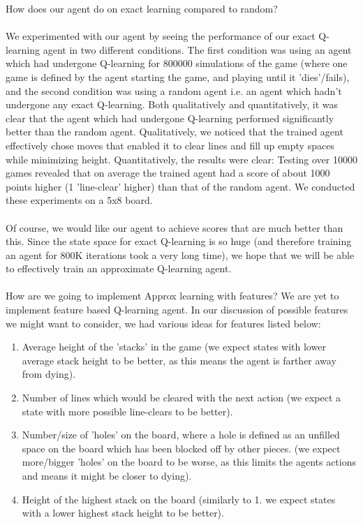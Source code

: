 \documentclass{article}
\begin{document}
How does our agent do on exact learning compared to random? \\\\
We experimented with our agent by seeing the performance of our exact Q-learning agent in two different conditions. The first condition was using an agent which had undergone Q-learning for 800000 simulations of the game (where one game is defined by the agent starting the game, and playing until it 'dies'/fails), and the second condition was using a random agent i.e. an agent which hadn't undergone any exact Q-learning. Both qualitatively and quantitatively, it was clear that the agent which had undergone Q-learning performed significantly better than the random agent. Qualitatively, we noticed that the trained agent effectively chose moves that enabled it to clear lines and fill up empty spaces while minimizing height. Quantitatively, the results were clear: Testing over 10000 games revealed that on average the trained agent had a score of about 1000 points higher (1 'line-clear' higher) than that of the random agent. We conducted these experiments on a 5x8 board.\\\\
Of course, we would like our agent to achieve scores that are much better than this. Since the state space for exact Q-learning is so huge (and therefore training an agent for 800K iterations took a very long time), we hope that we will be able to effectively train an approximate Q-learning agent.\\\\
How are we going to implement Approx learning with features?
We are yet to implement feature based Q-learning agent. In our discussion of possible features we might want to consider, we had various ideas for features listed below:
\begin{enumerate}
    \item Average height of the 'stacks' in the game (we expect states with lower average stack height to be better, as this means the agent is farther away from dying).
    \item Number of lines which would be cleared with the next action (we expect a state with more possible line-clears to be better).
    \item Number/size of 'holes' on the board, where a hole is defined as an unfilled space on the board which has been blocked off by other pieces. (we expect more/bigger 'holes' on the board to be worse, as this limits the agents actions and means it might be closer to dying).
    \item Height of the highest stack on the board (similarly to 1. we expect states with a lower highest stack height to be better).
\end{enumerate}
\end{document}
